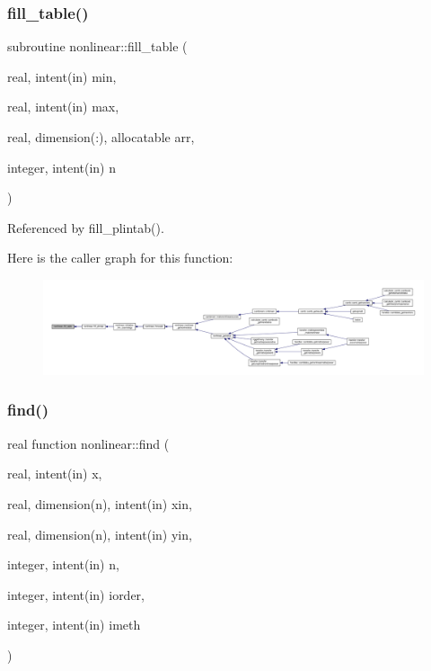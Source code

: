\subsubsection{\texorpdfstring{fill\+\_\+table()}{fill\_table()}}
{\footnotesize\ttfamily subroutine nonlinear\+::fill\+\_\+table (\begin{DoxyParamCaption}\item[{real, intent(in)}]{min,  }\item[{real, intent(in)}]{max,  }\item[{real, dimension(\+:), allocatable}]{arr,  }\item[{integer, intent(in)}]{n }\end{DoxyParamCaption})\hspace{0.3cm}{\ttfamily [private]}}



Referenced by fill\+\_\+plintab().

Here is the caller graph for this function\+:
\nopagebreak
\begin{figure}[H]
\begin{center}
\leavevmode
\includegraphics[width=350pt]{namespacenonlinear_a6ac027990c6d758a7c5420da7001dfc7_icgraph}
\end{center}
\end{figure}
\mbox{\label{namespacenonlinear_a553c7b86e3fd7c044f3fcef5b77c0a3f}} 
\subsubsection{\texorpdfstring{find()}{find()}}
{\footnotesize\ttfamily real function nonlinear\+::find (\begin{DoxyParamCaption}\item[{real, intent(in)}]{x,  }\item[{real, dimension(n), intent(in)}]{xin,  }\item[{real, dimension(n), intent(in)}]{yin,  }\item[{integer, intent(in)}]{n,  }\item[{integer, intent(in)}]{iorder,  }\item[{integer, intent(in)}]{imeth }\end{DoxyParamCaption})\hspace{0.3cm}{\ttfamily [private]}}



